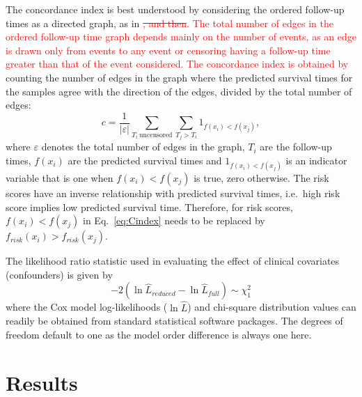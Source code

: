 \documentclass[letterpaper,12pt]{article}
\begin{document}
The concordance index is best understood by considering the ordered follow-up times as a directed graph, as in \citet{Raykar:07}\textcolor{red}{\sout{, and then}. The total number of edges in the ordered follow-up time graph depends mainly on the number of events, as an edge is drawn only from events to any event or censoring having a follow-up time greater than that of the event considered. The concordance index is obtained by} counting the number of edges in the graph where the predicted survival times for the samples agree with the direction of the edges, divided by the total number of edges:
\begin{equation}
c=\frac{1}{|\varepsilon |}\sum_{T_i~\text{uncensored} }\sum_{T_j > T_i}1_{f(x_i)<f(x_j)},
\label{eq:Cindex}
\end{equation}
where $\varepsilon$ denotes the total number of edges in the graph, $T_i$ are the follow-up times, $f(x_i)$ are the predicted survival times and $1_{f(x_i)<f(x_j)}$ is an indicator variable that is one when ${f(x_i)<f(x_j)}$ is true, zero otherwise. The risk scores have an inverse relationship with predicted survival times, i.e.\ high risk score implies low predicted survival time. Therefore, for risk scores, $f(x_i)<f(x_j)$ in Eq.\ \ref{eq:Cindex} needs to be replaced by $f_{risk}(x_i)>f_{risk}(x_j)$.

The likelihood ratio statistic used in evaluating the effect of clinical covariates (confounders) is given by
\begin{equation}
-2\left(\ln\hat{L}_{reduced} - \ln\hat{L}_{full} \right) \sim \chi^2_1
\label{eq:LRtest}
\end{equation}
where the Cox model log-likelihoods ($\ln\hat{L}$) and chi-square distribution values can readily be obtained from standard statistical software packages. The degrees of freedom default to one as the model order difference is always one here.



\section{Results}
\end{document}
